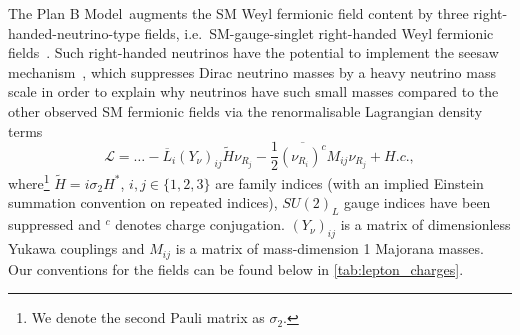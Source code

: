 \documentclass[11pt,letterpaper]{article}
\newcommand{\model}{Plan B Model}
\begin{document}
The \model\  augments the SM Weyl fermionic field content by three
right-handed-neutrino-type fields, i.e.\ SM-gauge-singlet right-handed Weyl
fermionic fields~\cite{Allanach:2023uxz}. Such right-handed 
neutrinos have the potential to implement the seesaw
mechanism~\cite{Minkowski:1977sc,Yanagida:1980xy,Glashow:1979nm,Mohapatra:1979ia,Schechter:1979bn}, which suppresses Dirac neutrino masses by a
heavy neutrino mass scale in order to explain why neutrinos have such small
masses compared to the other observed SM fermionic fields via the
renormalisable Lagrangian density terms 
\begin{equation} \label{Neutrino Mass Lagrangian}
  {\mathcal L} = \ldots - {\overline L_i} (Y_\nu)_{ij} \tilde H \nu_{R_j} 
  - \frac{1}{2}
  {\overline{(\nu_{R_i})^c}} M_{ij} \nu_{R_j} + H.c., 
  \end{equation}
where\footnote{We denote the second Pauli matrix as $\sigma_2$.} $\tilde H=i \sigma_2 H^\ast$,
$i,j \in \{1,2,3\}$ are family indices (with an implied Einstein
summation convention on repeated indices), $SU(2)_L$ gauge indices have been
suppressed and ${}^c$ denotes charge conjugation. $(Y_\nu)_{ij}$ is a matrix
of dimensionless Yukawa couplings and 
$M_{ij}$ is a matrix of mass-dimension 1 Majorana masses. Our conventions for
the fields
can be found below in \cref{tab:lepton_charges}.
\end{document}
